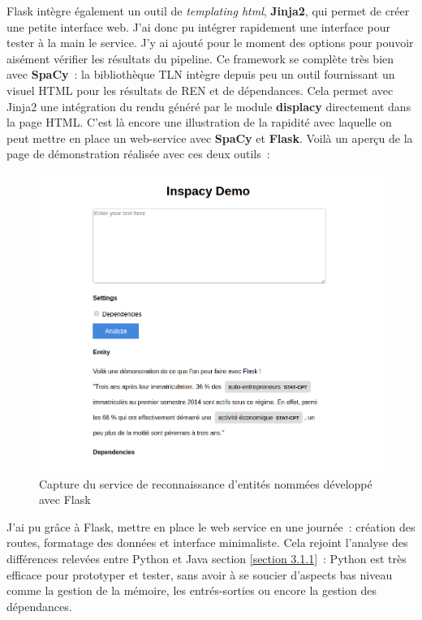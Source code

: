 Flask intègre également un outil de \textit{templating html}, \textbf{Jinja2}, qui permet de créer une petite interface web. J'ai donc pu intégrer rapidement une interface pour tester à la main le service. J'y ai ajouté pour le moment des options pour pouvoir aisément vérifier les résultats du pipeline. Ce framework se complète très bien avec \textbf{SpaCy}~: la bibliothèque TLN intègre depuis peu un outil fournissant un visuel HTML pour les résultats de REN et de dépendances. Cela permet avec Jinja2 une intégration du rendu généré par le module \textbf{displacy} directement dans la page HTML. C'est là encore une illustration de la rapidité avec laquelle on peut mettre en place un web-service avec \textbf{SpaCy} et \textbf{Flask}. Voilà un aperçu de la page de démonstration réalisée avec ces deux outils~:
\begin{figure}[H]
    \centering
    \includegraphics[scale=0.6]{images/inspaCy-demo.png}
    \caption{Capture du service de reconnaissance d'entités nommées développé avec Flask}
    \label{fig:demo-inspaCy}
\end{figure}

J'ai pu grâce à Flask, mettre en place le web service en une journée~: création des routes, formatage des données et interface minimaliste. Cela rejoint l'analyse des différences relevées entre Python et Java section \ref{section 3.1.1}~: Python est très efficace pour prototyper et tester, sans avoir à se soucier d'aspects bas niveau comme la gestion de la mémoire, les entrés-sorties ou encore la gestion des dépendances.
\label{section 3.2.2 - Flask}

